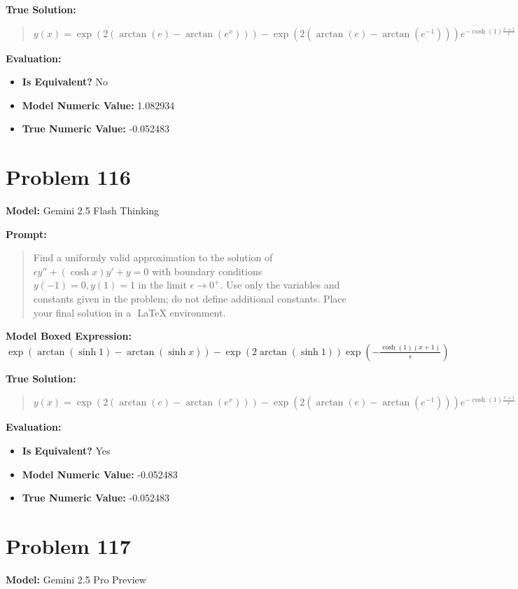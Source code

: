 \documentclass{article}
\begin{document}
{\textbf{True Solution:}
\begin{quote}
$y(x) = \exp (2(\arctan(e)-\arctan(e^{x})))-\exp(2(\arctan(e)-\arctan(e^{-1})))e^{-\cosh(1)\frac{x+1}{\epsilon}}$
\end{quote}

\textbf{Evaluation:}
\begin{itemize}
\item \textbf{Is Equivalent?} No
\item \textbf{Model Numeric Value:} 1.082934
\item \textbf{True Numeric Value:} -0.052483
\end{itemize}
\vspace{1cm}
\section*{Problem 116}
\textbf{Model:} Gemini 2.5 Flash Thinking

\textbf{Prompt:}
\begin{quote}
Find a uniformly valid approximation to the solution of $\epsilon y'' + (\cosh x)y' + y = 0$ with boundary conditions $y(-1) = 0, y(1) = 1$ in the limit $\epsilon \to 0^+$. Use only the variables and constants given in the problem; do not define additional constants. Place your final solution in a $\boxed{}$ LaTeX environment.
\end{quote}
\textbf{Model Boxed Expression:} $\exp(\arctan(\sinh 1) - \arctan(\sinh x)) - \exp(2\arctan(\sinh 1)) \exp\left(-\frac{\cosh(1)(x+1)}{\epsilon}\right)$

\textbf{True Solution:}
\begin{quote}
$y(x) = \exp (2(\arctan(e)-\arctan(e^{x})))-\exp(2(\arctan(e)-\arctan(e^{-1})))e^{-\cosh(1)\frac{x+1}{\epsilon}}$
\end{quote}

\textbf{Evaluation:}
\begin{itemize}
\item \textbf{Is Equivalent?} Yes
\item \textbf{Model Numeric Value:} -0.052483
\item \textbf{True Numeric Value:} -0.052483
\end{itemize}
\vspace{1cm}
\section*{Problem 117}
\textbf{Model:} Gemini 2.5 Pro Preview

}
\end{document}
